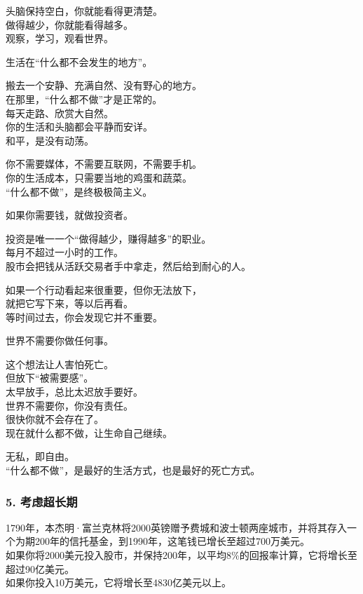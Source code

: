 \documentclass[
]{article}
\begin{document}
头脑保持空白，你就能看得更清楚。\\
做得越少，你就能看得越多。\\
观察，学习，观看世界。

生活在``什么都不会发生的地方''。

搬去一个安静、充满自然、没有野心的地方。\\
在那里，``什么都不做''才是正常的。\\
每天走路、欣赏大自然。\\
你的生活和头脑都会平静而安详。\\
和平，是没有动荡。

你不需要媒体，不需要互联网，不需要手机。\\
你的生活成本，只需要当地的鸡蛋和蔬菜。\\
``什么都不做''，是终极极简主义。

如果你需要钱，就做投资者。

投资是唯一一个``做得越少，赚得越多''的职业。\\
每月不超过一小时的工作。\\
股市会把钱从活跃交易者手中拿走，然后给到耐心的人。

如果一个行动看起来很重要，但你无法放下，\\
就把它写下来，等以后再看。\\
等时间过去，你会发现它并不重要。

世界不需要你做任何事。

这个想法让人害怕死亡。\\
但放下``被需要感''。\\
太早放手，总比太迟放手要好。\\
世界不需要你，你没有责任。\\
很快你就不会存在了。\\
现在就什么都不做，让生命自己继续。

无私，即自由。\\
``什么都不做''，是最好的生活方式，也是最好的死亡方式。

\subsubsection{5. 考虑超长期}\label{5-ux8003ux8651ux8d85ux957fux671f}

1790年，本杰明·富兰克林将2000英镑赠予费城和波士顿两座城市，并将其存入一个为期200年的信托基金，到1990年，这笔钱已增长至超过700万美元。\\
如果你将2000美元投入股市，并保持200年，以平均8\%的回报率计算，它将增长至超过90亿美元。\\
如果你投入10万美元，它将增长至4830亿美元以上。
\end{document}
